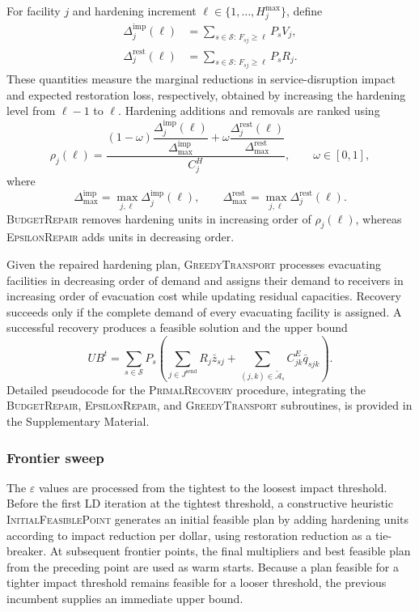 \documentclass[preprint,11pt,authoryear]{elsarticle}
\begin{document}
For facility $j$ and hardening increment
$\ell\in\{1,\ldots,H_j^{\max}\}$, define
\begin{align*}
\Delta_j^{\mathrm{imp}}(\ell)
&=
\sum_{s\in\mathcal S:\,F_{sj}\geq\ell}
P_sV_j,
\\
\Delta_j^{\mathrm{rest}}(\ell)
&=
\sum_{s\in\mathcal S:\,F_{sj}\geq\ell}
P_sR_j.
\end{align*}
These quantities measure the marginal reductions in service-disruption impact
and expected restoration loss, respectively, obtained by increasing the
hardening level from $\ell-1$ to $\ell$. Hardening additions and removals are
ranked using
\[
\rho_j(\ell)
=
\frac{
(1-\omega)
\dfrac{\Delta_j^{\mathrm{imp}}(\ell)}
{\Delta_{\max}^{\mathrm{imp}}}
+
\omega
\dfrac{\Delta_j^{\mathrm{rest}}(\ell)}
{\Delta_{\max}^{\mathrm{rest}}}
}
{C_j^H},
\qquad
\omega\in[0,1],
\]
where
\[
\Delta_{\max}^{\mathrm{imp}}
=
\max_{j,\ell}\Delta_j^{\mathrm{imp}}(\ell),
\qquad
\Delta_{\max}^{\mathrm{rest}}
=
\max_{j,\ell}\Delta_j^{\mathrm{rest}}(\ell).
\]
\textsc{BudgetRepair} removes hardening units in increasing order of
$\rho_j(\ell)$, whereas \textsc{EpsilonRepair} adds units in decreasing
order.

Given the repaired hardening plan, \textsc{GreedyTransport} processes
evacuating facilities in decreasing order of demand and assigns their demand
to receivers in increasing order of evacuation cost while updating residual
capacities. Recovery succeeds only if the complete demand of every evacuating
facility is assigned. A successful recovery produces a feasible solution and
the upper bound
\[
UB^t
=
\sum_{s\in\mathcal S}P_s
\left(
\sum_{j\in J^{\mathrm{send}}}R_j\bar z_{sj}
+
\sum_{(j,k)\in\widetilde{\mathcal A}_s}
C_{jk}^E\bar q_{sjk}
\right).
\]
Detailed pseudocode for the \textsc{PrimalRecovery} procedure, integrating
the \textsc{BudgetRepair}, \textsc{EpsilonRepair}, and
\textsc{GreedyTransport} subroutines, is provided in the Supplementary
Material.

\subsubsection{Frontier sweep}
\label{sec:ld_frontier}

The $\varepsilon$ values are processed from the tightest to the loosest impact
threshold. Before the first LD iteration at the tightest threshold, a constructive heuristic \textsc{InitialFeasiblePoint} generates an
initial feasible plan by adding hardening units according to impact reduction
per dollar, using restoration reduction as a tie-breaker.  At subsequent
frontier points, the final multipliers and best feasible plan from the
preceding point are used as warm starts. Because a plan feasible for a tighter
impact threshold remains feasible for a looser threshold, the previous
incumbent supplies an immediate upper bound.
\end{document}
